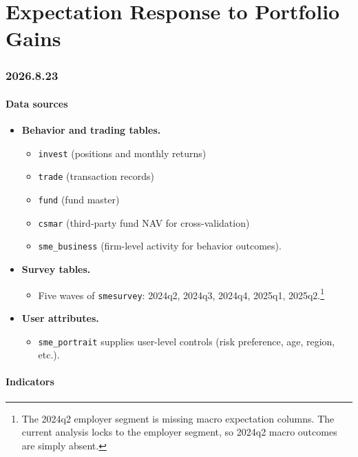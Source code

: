 \documentclass[11pt,letterpaper,english,final]{article}
\begin{document}
{\centering \part*{Expectation Response to Portfolio Gains}}

\section{2026.8.23}

\subsection{Data sources}

\begin{itemize}
\item \textbf{Behavior and trading tables.} 
  \begin{itemize}
    \item \texttt{invest} (positions and monthly returns)
    \item \texttt{trade} (transaction records)
    \item \texttt{fund} (fund master)
    \item \texttt{csmar} (third-party fund NAV for cross-validation)
    \item \texttt{sme\_business} (firm-level activity for behavior outcomes).
  \end{itemize}

\item \textbf{Survey tables.}
  \begin{itemize}
    \item Five waves of \texttt{smesurvey}: 2024q2, 2024q3, 2024q4, 2025q1, 2025q2.\footnote{The 2024q2 employer segment is missing macro expectation columns. The current analysis locks to the employer segment, so 2024q2 macro outcomes are simply absent.}
  \end{itemize}

\item \textbf{User attributes.}
  \begin{itemize}
    \item \texttt{sme\_portrait} supplies user-level controls (risk preference, age, region, etc.).
  \end{itemize}
\end{itemize}

\subsection{Indicators}
\end{document}
